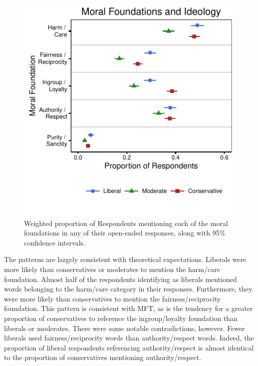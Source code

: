 \documentclass[12pt]{article}
\begin{document}
\begin{figure}[h]\centering
\includegraphics{../calc/fig/prop_ideol.pdf}
\caption{Weighted proportion of Respondents mentioning each of the moral foundations in any of their open-ended responses, along with 95\% confidence intervals.}\label{fig:prop_ideol}
\end{figure}

The patterns are largely consistent with theoretical expectations. Liberals were more likely than conservatives or moderates to mention the harm/care foundation. Almost half of the respondents identifying as liberals mentioned words belonging to the harm/care category in their responses. Furthermore, they were more likely than conservatives to mention the fairness/reciprocity foundation. This pattern is consistent with MFT, as is the tendency for a greater proportion of conservatives to reference the ingroup/loyalty foundation than liberals or moderates. There were some notable contradictions, however. Fewer liberals used fairness/reciprocity words than authority/respect words. Indeed, the proportion of liberal respondents referencing authority/respect is almost identical to the proportion of conservatives mentioning authority/respect.
\end{document}
